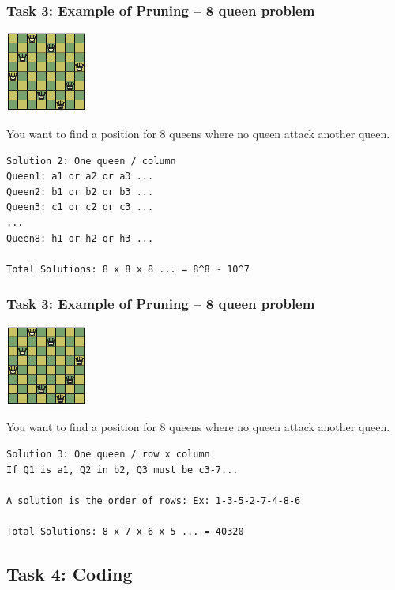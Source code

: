 \documentclass{beamer}
\begin{document}
\begin{frame}[fragile]
  \frametitle{Task 3: Example of Pruning -- 8 queen problem}

  \hfill \includegraphics[width=0.2\textwidth]{../img/8queen}

  You want to find a position for 8 queens where no queen attack another queen.

  \bigskip

\begin{verbatim}
Solution 2: One queen / column
Queen1: a1 or a2 or a3 ...
Queen2: b1 or b2 or b3 ...
Queen3: c1 or c2 or c3 ...
...
Queen8: h1 or h2 or h3 ...

Total Solutions: 8 x 8 x 8 ... = 8^8 ~ 10^7
\end{verbatim}
\end{frame}

\begin{frame}[fragile]
  \frametitle{Task 3: Example of Pruning -- 8 queen problem}

  \hfill \includegraphics[width=0.2\textwidth]{../img/8queen}

  You want to find a position for 8 queens where no queen attack another queen.

  \bigskip

\begin{verbatim}
Solution 3: One queen / row x column
If Q1 is a1, Q2 in b2, Q3 must be c3-7...

A solution is the order of rows: Ex: 1-3-5-2-7-4-8-6

Total Solutions: 8 x 7 x 6 x 5 ... = 40320
\end{verbatim}
\end{frame}

\subsection{Task 4: Coding}
\end{document}
